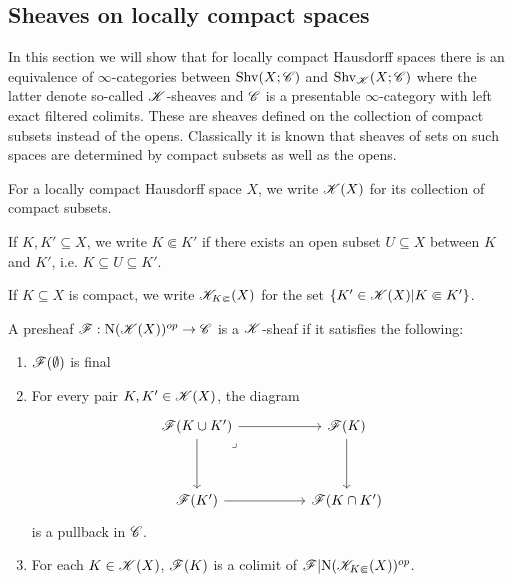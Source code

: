 \documentclass[../thesis.tex]{subfiles}
\begin{document}
\subsection{Sheaves on locally compact spaces}
In this section we will show that for locally compact Hausdorff spaces there is an equivalence of $\infty$-categories between $\mathrm{Shv}(X;\mathscr{C})$ and $\mathrm{Shv}_{\mathscr{K}}(X;\mathscr{C})$ where the latter denote so-called $\mathscr{K}$-sheaves and $\mathscr{C}$ is a presentable $\infty$-category with left exact filtered colimits.
These are sheaves defined on the collection of compact subsets instead of the opens.
Classically it is known that sheaves of sets on such spaces are determined by compact subsets as well as the opens.
\begin{definition}
    For a locally compact Hausdorff space $X$, we write $\mathscr{K}(X)$ for its collection of compact subsets.
\end{definition}
\begin{definition}
    If $K, K' \subseteq X$, we write $K \Subset K'$ if there exists an open subset $U\subseteq X$ between $K$ and $K'$, i.e. $K \subseteq U \subseteq K'$.
\end{definition}
\begin{definition}
    If $K\subseteq X$ is compact, we write $\mathscr{K}_{K\Subset}(X)$ for the set $\{ K'\in \mathscr{K}(X) | K \Subset K' \}$.
\end{definition}
\begin{definition}
    A presheaf $\mathscr{F}:\mathrm{N}(\mathscr{K}(X))^{op}\to \mathscr{C}$ is a $\mathscr{K}$-sheaf if it satisfies the following:
    \begin{enumerate}
        \item $\mathscr{F}(\emptyset)$ is final
        \item For every pair $K,K'\in \mathscr{K}(X)$, the diagram
              \[\begin{tikzcd}
                      {\F(K \cup K')} && {\F(K)} \\
                      \\
                      {\F(K')} && {\F(K\cap K')}
                      \arrow[from=1-3, to=3-3]
                      \arrow[from=3-1, to=3-3]
                      \arrow[from=1-1, to=3-1]
                      \arrow["\lrcorner"{anchor=center, pos=0.125}, draw=none, from=1-1, to=3-3]
                      \arrow[from=1-1, to=1-3]
                  \end{tikzcd}\]
              is a pullback in $\mathscr{C}$.
        \item For each $K\in \mathscr{K}(X)$, $\mathscr{F}(K)$ is a colimit of $\mathscr{F}|\mathrm{N}(\mathscr{K}_{K\Subset}(X))^{op}$.
    \end{enumerate}
\end{definition}
\end{document}

